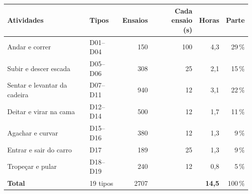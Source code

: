 \begin{tabular}{@{}l l r r r r@{}}
\toprule
Atividades & Tipos & Ensaios & \makecell[r]{Cada ensaio\\(s)} & Horas & Parte \\
\midrule
Andar e correr & D01--D04 & 150 & 100 & 4,3 & 29\,\% \\
Subir e descer escada & D05--D06 & 308 & 25 & 2,1 & 15\,\% \\
Sentar e levantar da cadeira & D07--D11 & 940 & 12 & 3,1 & 22\,\% \\
Deitar e virar na cama & D12--D14 & 500 & 12 & 1,7 & 11\,\% \\
Agachar e curvar & D15--D16 & 380 & 12 & 1,3 & 9\,\% \\
Entrar e sair do carro & D17 & 189 & 25 & 1,3 & 9\,\% \\
Tropeçar e pular & D18--D19 & 240 & 12 & 0,8 & 5\,\% \\
\midrule
\textbf{Total} & 19 tipos & 2707 & & \textbf{14,5} & 100\,\% \\
\bottomrule
\end{tabular}

